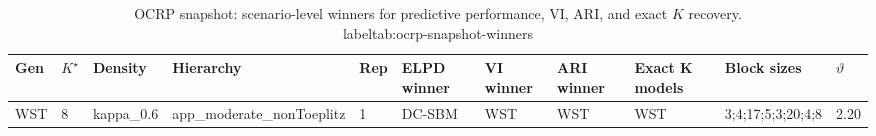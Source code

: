 \begin{table}[!h]
\centering
\caption{OCRP snapshot: scenario-level winners for predictive performance, VI, ARI, and exact $K$ recovery.\\label{tab:ocrp-snapshot-winners}}
\centering
\begin{tabular}[t]{lllllllllll}
\toprule
Gen & $K^\star$ & Density & Hierarchy & Rep & ELPD winner & VI winner & ARI winner & Exact K models & Block sizes & $\vartheta$\\
\midrule
WST & 8 & kappa_0.6 & app_moderate_nonToeplitz & 1 & DC-SBM & WST & WST & WST & 3;4;17;5;3;20;4;8 & 2.20\\
\bottomrule
\end{tabular}
\end{table}
